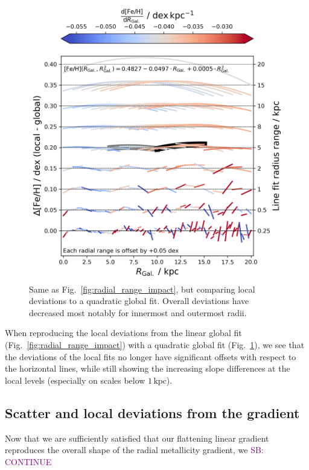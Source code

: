 \documentclass[fleqn,usenatbib]{mnras}
\newcommand{\SB}[1]{{\textcolor{purple}{SB: #1}}}
\begin{document}
\begin{figure}
    \centering
    \includegraphics[width=\columnwidth]{figures/radial_range_impact_quadratic.png}
    \caption{Same as Fig.~\ref{fig:radial_range_impact}, but comparing local deviations to a quadratic global fit. Overall deviations have decreased most notably for innermost and outermost radii.}
    \label{fig:radial_range_impact_quadratic}
\end{figure}

When reproducing the local deviations from the linear global fit (Fig.~\ref{fig:radial_range_impact}) with a quadratic global fit (Fig.~\ref{fig:radial_range_impact_quadratic}), we see that the deviations of the local fits no longer have significant offsets with respect to the horizontal lines, while still showing the increasing slope differences at the local levels (especially on scales below $1\,\mathrm{kpc}$). 

\subsection{Scatter and local deviations from the gradient}
\label{sec:scatter_radial_metallicity_gradients}

Now that we are sufficiently satisfied that our flattening linear gradient reproduces the overall shape of the radial metallicity gradient, we \SB{CONTINUE}
\end{document}
